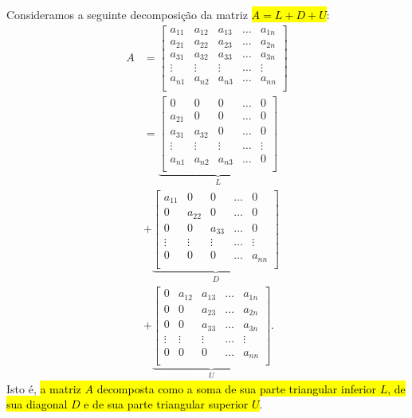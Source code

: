Consideramos a seguinte decomposição da matriz \hl{$A = L + D + U$}:
\begin{align}
  A &=
  \begin{bmatrix}
    a_{11} & a_{12} & a_{13} & \ldots & a_{1n}\\
    a_{21} & a_{22} & a_{23} & \ldots & a_{2n}\\
    a_{31} & a_{32} & a_{33} & \ldots & a_{3n}\\
    \vdots & \vdots & \vdots & \ldots & \vdots\\
    a_{n1} & a_{n2} & a_{n3} & \ldots & a_{nn}\\
  \end{bmatrix}\\
    &= \underbrace{\begin{bmatrix}
    0 & 0 & 0 & \ldots & 0\\
    a_{21} & 0 & 0 & \ldots & 0\\
    a_{31} & a_{32} & 0 & \ldots & 0\\
    \vdots & \vdots & \vdots & \ldots & \vdots\\
    a_{n1} & a_{n2} & a_{n3} & \ldots & 0\\
  \end{bmatrix}}_{L}\\
    &+ \underbrace{\begin{bmatrix}
    a_{11} & 0 & 0 & \ldots & 0\\
    0 & a_{22} & 0 & \ldots & 0\\
    0 & 0 & a_{33} & \ldots & 0\\
    \vdots & \vdots & \vdots & \ldots & \vdots\\
    0 & 0 & 0 & \ldots & a_{nn}\\
  \end{bmatrix}}_{D}\\
  &+ \underbrace{\begin{bmatrix}
    0 & a_{12} & a_{13} & \ldots & a_{1n}\\
    0 & 0 & a_{23} & \ldots & a_{2n}\\
    0 & 0 & a_{33} & \ldots & a_{3n}\\
    \vdots & \vdots & \vdots & \ldots & \vdots\\
    0 & 0 & 0 & \ldots & a_{nn}\\
  \end{bmatrix}}_{U}.
\end{align}
Isto é, \hl{a matriz $A$ decomposta como a soma de sua parte triangular inferior $L$, de sua diagonal $D$ e de sua parte triangular superior $U$}.

